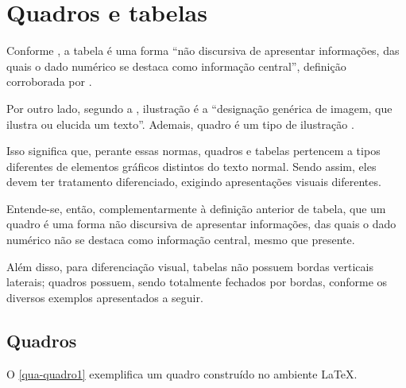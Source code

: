 \section{Quadros e tabelas}

Conforme , a tabela é uma forma ``não discursiva de apresentar informações, das quais o dado numérico se destaca como informação central'', definição corroborada por .

Por outro lado, segundo a , ilustração é a ``designação genérica de imagem, que ilustra ou elucida um texto''. Ademais, quadro é um tipo de ilustração \cite[seção 5.8]{NBR14724:2024}.

Isso significa que, perante essas normas, quadros e tabelas pertencem a tipos diferentes de elementos gráficos distintos do texto normal. Sendo assim, eles devem ter tratamento diferenciado, exigindo apresentações visuais diferentes.

Entende-se, então, complementarmente à definição anterior de tabela, que um quadro é uma forma não discursiva de apresentar informações, das quais o dado numérico não se destaca como informação central, mesmo que presente.

Além disso, para diferenciação visual, tabelas não possuem bordas verticais laterais; quadros possuem, sendo totalmente fechados por bordas, conforme os diversos exemplos apresentados a seguir.

\subsection{Quadros}

O \autoref{qua-quadro1} exemplifica um quadro construído no ambiente \LaTeX.

